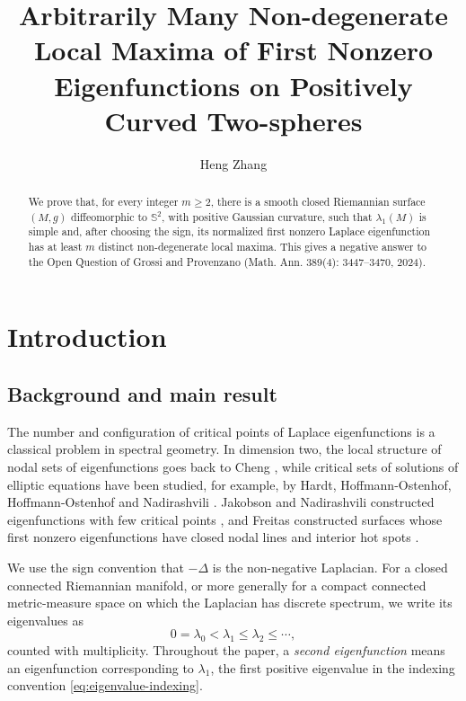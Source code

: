 \documentclass[11pt]{amsart}
\title[Non-degenerate Local Maxima on Positively Curved two-Spheres]{Arbitrarily Many Non-degenerate Local Maxima of First Nonzero Eigenfunctions on Positively Curved Two-spheres}
\author{Heng Zhang}
\date{}
\numberwithin{equation}{section}
\begin{document}
\begin{abstract}
We prove that, for every integer $m\ge 2$, there is a smooth closed Riemannian
surface $(M,g)$ diffeomorphic to $\mathbb S^2$, with positive Gaussian curvature, such
that $\lambda_1(M)$ is simple and, after choosing the sign, its normalized first
nonzero Laplace eigenfunction has at least $m$ distinct non-degenerate local
maxima.  This gives a negative answer to the Open Question of Grossi and
Provenzano (Math. Ann. 389(4): 3447--3470, 2024).
\end{abstract}

\maketitle

\section{Introduction}

\subsection{Background and main result}

The number and configuration of critical points of Laplace eigenfunctions is a
classical problem in spectral geometry.  In dimension two, the local structure of
nodal sets of eigenfunctions goes back to Cheng \cite{Cheng1976}, while critical
sets of solutions of elliptic equations have been studied, for example, by Hardt,
Hoffmann-Ostenhof, Hoffmann-Ostenhof and Nadirashvili
\cite{HardtHoffmannOstenhofNadirashvili1999}.  Jakobson and Nadirashvili
constructed eigenfunctions with few critical points
\cite{JakobsonNadirashvili1999}, and Freitas constructed surfaces whose first
nonzero eigenfunctions have closed nodal lines and interior hot spots
\cite{Freitas2002}.

We use the sign convention that $-\Delta$ is the non-negative Laplacian.  For a
closed connected Riemannian manifold, or more generally for a compact connected
metric-measure space on which the Laplacian has discrete spectrum, we write its
eigenvalues as
\begin{equation}\label{eq:eigenvalue-indexing}
0=\lambda_0<\lambda_1\le \lambda_2\le\cdots,
\end{equation}
counted with multiplicity.  Throughout the paper, a \emph{second eigenfunction}
means an eigenfunction corresponding to $\lambda_1$, the first positive
eigenvalue in the indexing convention \eqref{eq:eigenvalue-indexing}.
\end{document}
